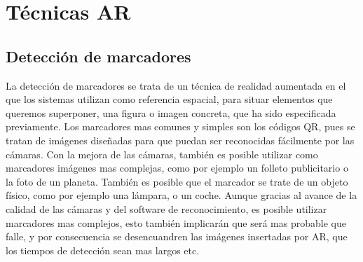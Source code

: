 \section{Técnicas AR}
	\subsection{Detección de marcadores}
	La detección de marcadores se trata de un técnica de realidad aumentada en el que los sistemas utilizan como referencia espacial, para situar elementos que queremos superponer, una figura o imagen concreta, que ha sido especificada previamente. Los marcadores mas comunes y simples son los códigos QR, pues se tratan de imágenes diseñadas para que puedan ser reconocidas fácilmente por las cámaras.
	Con la mejora de las cámaras, también es posible utilizar como marcadores imágenes mas complejas, como por ejemplo un folleto publicitario o la foto de un planeta.
	También es posible que el marcador se trate de un objeto físico, como por ejemplo una lámpara, o un coche.
	Aunque gracias al avance de la calidad de las cámaras y del software de reconocimiento, es posible utilizar marcadores mas complejos, esto también implicarán que será mas probable que falle, y por consecuencia se desencuandren las imágenes insertadas por AR, que los tiempos de detección sean mas largos etc.
	
